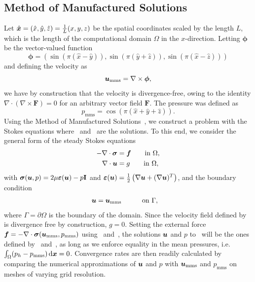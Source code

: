\documentclass{WileyMSP-template}
\begin{document}
\subsection{Method of Manufactured Solutions}\label{subsec:mms}
Let $\hat{\bm{x}} = (\hat{x}, \hat{y}, \hat{z}) = \frac{1}{L}(x, y, z)$
be the spatial coordinates scaled by the length $L$, which is the length of
the computational domain $\Omega$ in the $x$-direction. Letting $\bm{\phi}$ be
the vector-valued function
\begin{equation*}
    \bm{\phi} = \left(\sin{(\pi(\hat{x} - \hat{y}))},
    \sin{(\pi(\hat{y} + \hat{z}))},
    \sin{(\pi(\hat{x} - \hat{z}))}\right)
\end{equation*}
and defining the velocity as 
\begin{equation}
    \bm{u}_{\mathrm{mms}} = \nabla\times\bm{\phi},
    \label{eq:velocity_mms}
\end{equation}
we have by construction that the velocity is divergence-free,
owing to the identity $\nabla\cdot(\nabla\times\bm{F}) = 0$ for
an arbitrary vector field $\bm{F}$. The pressure was defined as
\begin{equation}
    p_{\mathrm{mms}} = \cos{(\pi(\hat{x} + \hat{y} + \hat{z}))}.
    \label{eq:pressure_mms}
\end{equation}
Using the Method of Manufactured Solutions~\cite{Roache2001CodeSolutions},
we construct a problem with the Stokes equations where~
and~ are the solutions.
To this end, we consider the general form of the steady Stokes equations
\begin{subequations}
    \begin{align}
        -\nabla\cdot\bm{\sigma} &= \bm{f} \qquad\mathrm{in \ }\Omega,\\
        \nabla\cdot\bm{u} &= g \qquad\mathrm{in \ }\Omega,
    \end{align}
    \label{eq:stokes_mms}%
\end{subequations}%
with $\bm{\sigma}(\bm{u}, p) = 2\mu\bm{\varepsilon}(\bm{u}) - p\mathbf{I}$ and
$\bm{\varepsilon}(\bm{u}) = \frac{1}{2}\left(\nabla\bm{u} + (\nabla\bm{u})^T\right)$, and the boundary condition
\begin{alignat}{2}
    \bm{u} &= \bm{u}_{\mathrm{mms}} \qquad&&\mathrm{on \ }\Gamma,
\end{alignat}
where $\Gamma=\partial\Omega$ is the boundary of the domain.
Since the velocity field defined by~ is divergence free by construction,
$g = 0$. Setting the external force $\bm{f}=-\nabla\cdot\bm{\sigma}(\bm{u}_{\mathrm{mms}}, p_{\mathrm{mms}})$
using~ and~,
the solutions $\bm{u}$ and $p$ to~ will be the ones
defined by~ and~,
as long as we enforce equality in the mean pressures, i.e. $\int_{\Omega}(p_h - p_{\mathrm{mms}}) \, \mathrm d\bm{x}=0$.
Convergence rates are then readily calculated by comparing the numerical approximations of
$\bm{u}$ and $p$ with $\bm{u}_{\mathrm{mms}}$ and $p_{\mathrm{mms}}$
on meshes of varying grid resolution.
\end{document}
